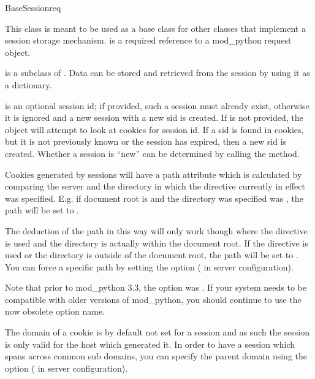 \begin{classdesc}{BaseSession}{req}

  This class is meant to be used as a base class for other classes
  that implement a session storage mechanism.  is a required
  reference to a mod_python request object.

   is a subclass of . Data can be
  stored and retrieved from the session by using it as a
  dictionary. 

   is an optional session id; if provided, such a session
  must already exist, otherwise it is ignored and a new session with a
  new sid is created. If  is not provided, the object will
  attempt to look at cookies for session id. If a sid is found in
  cookies, but it is not previously known or the session has expired,
  then a new sid is created. Whether a session is ``new'' can be
  determined by calling the  method.

  Cookies generated by sessions will have a path attribute which is
  calculated by comparing the server  and the directory
  in which the  directive currently in effect was
  specified. E.g. if document root is  and the directory
   was specified was , the path will be
  set to .
  
  The deduction of the path in this way will only work though where the
   directive is used and the directory is actually within
  the document root. If the  directive is used or the
  directory is outside of the document root, the path will be set to
  \file{/}. You can force a specific path by setting the
   option ( in server configuration).

  Note that prior to mod_python 3.3, the option was .
  If your system needs to be compatible with older versions of mod_python,
  you should continue to use the now obsolete option name.

  The domain of a cookie is by default not set for a session and as such
  the session is only valid for the host which generated it. In order to
  have a session which spans across common sub domains, you can specify the
  parent domain using the 
  option ( in server configuration).


\end{classdesc}
